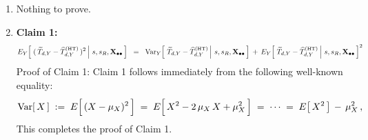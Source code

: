 \begin{enumerate}
\item
    Nothing to prove.
\item
    \textbf{Claim 1:}\quad
    \begin{equation*}
    E_{Y}\!\left[\,
        \left.
        (\,\widetilde{T}_{d,Y} - \widehat{T}^{\textnormal{(HT)}}_{d,Y}\,)^{2}
        \,\right\vert\,
        s,s_{R},\mathbf{X}_{\bullet\bullet}
        \,\right]
    \;\; = \;\;
        \textnormal{Var}_{Y}\!\left[\,
            \left.
            \widetilde{T}_{d,Y} - \widehat{T}^{\textnormal{(HT)}}_{d,Y}
            \,\right\vert\,
            s,s_{R},\mathbf{X}_{\bullet\bullet}
            \,\right]
        \,+\,
        E_{Y}\!\left[\,
            \left.
            \widetilde{T}_{d,Y} - \widehat{T}^{\textnormal{(HT)}}_{d,Y}
            \,\right\vert\,
            s,s_{R},\mathbf{X}_{\bullet\bullet}
            \,\right]^{2}
    \end{equation*}
    \vskip 0.1cm
    \noindent
    Proof of Claim 1:\;\;
    Claim 1 follows immediately from the following well-known equality:
    \begin{equation*}
    \Var[\,X\,]
    \; := \;
        E\!\left[\,\overset{{\color{white}.}}{(X - \mu_{X})^{2}}\,\right]
    \; = \;
        E\!\left[\,\overset{{\color{white}.}}{X^{2} - 2\,\mu_{X}\,X + \mu_{X}^{2}}\,\right]
    \; = \;
        \cdots
    \; = \;
        E\!\left[\,X^{2}\,\right] \,-\, \mu_{X}^{2}\,,
    \end{equation*}
    This completes the proof of Claim 1.


\end{enumerate}
